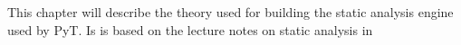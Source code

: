 This chapter will describe the theory used for building the static analysis engine used by PyT.
Is is based on the lecture notes on static analysis in \citet{schwartzbach}
